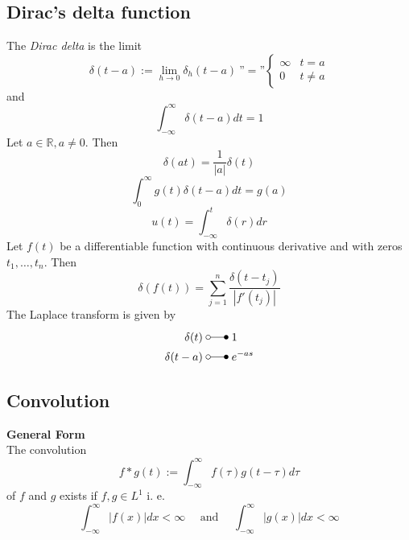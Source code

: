 \subsection{Dirac's delta function}
The \textit{Dirac delta} is the limit
\begin{equation*}
    \delta(t-a):=\lim_{h\to0}\delta_h(t-a)\:\text{''}=\text{''}
    \begin{cases}
        \infty & t=a    \\
        0      & t\ne a
    \end{cases}
\end{equation*}
and
\begin{equation*}
    \int_{-\infty}^{\infty}\delta(t-a)dt=1
\end{equation*}
Let $a \in \mathbb{R}, a \ne 0$. Then
\begin{equation*}
    \delta(at)=\frac1{|a|}\delta(t)
\end{equation*}
\begin{equation*}
    \int_{0}^{\infty} g(t)\delta(t-a)dt=g(a)
\end{equation*}
\begin{equation*}
    u(t)=\int_{-\infty}^{t}\delta(r)dr
\end{equation*}
Let $f(t)$ be a differentiable function with continuous derivative and with zeros $t_1,\dots,t_n$. Then
\begin{equation*}
    \delta(f(t))=\sum_{j=1}^n\frac{\delta(t-t_j)}{|f'(t_j)|}
\end{equation*}
The Laplace transform is given by
\begin{align*}
    \delta(t)   & \;\laplace\; 1       \\
    \delta(t-a) & \;\laplace\; e^{-as}
\end{align*}

\subsection{Convolution}
\textbf{General Form}\\
The convolution
\begin{equation*}
    f*g(t):=\int_{-\infty}^{\infty}f(\tau)g(t-\tau)d\tau
\end{equation*}
of $f$ and $g$ exists if $f,g\in L^1$ i. e.
\begin{equation*}
    \int_{-\infty}^{\infty}\left|f(x)\right|dx<\infty\quad\text{ and }\quad\int_{-\infty}^{\infty}\left|g(x)\right|dx<\infty
\end{equation*}

